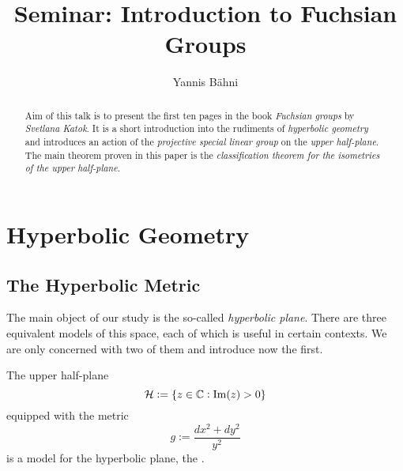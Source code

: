 

\title{Seminar: Introduction to Fuchsian Groups}
\author{Yannis B\"{a}hni}
\address[Yannis B\"{a}hni]{University of Zurich, R\"{a}mistrasse 71, 8006 Zurich}



\maketitle

\begin{abstract}
	Aim of this talk is to present the first ten pages in the book \emph{Fuchsian groups} by \emph{Svetlana Katok}. It is a short introduction into the rudiments of \emph{hyperbolic geometry} and introduces an action of the \emph{projective special linear group} on the \emph{upper half-plane}. The main theorem proven in this paper is the \emph{classification theorem for the isometries of the upper half-plane}.
\end{abstract}

\tableofcontents

\section{Hyperbolic Geometry}
\subsection{The Hyperbolic Metric}
The main object of our study is the so-called \emph{hyperbolic plane}. There are three equivalent models of this space, each of which is useful in certain contexts. We are only concerned with two of them and introduce now the first. 

\begin{definition}
	The upper half-plane
	\begin{equation}
		\Hcal := \cbr[0]{z \in \Cbb : \Im(z) > 0}
	\end{equation}
	\noindent equipped with the metric
	\begin{equation}
		g := \frac{dx^2 + dy^2}{y^2}
	\end{equation}
	\noindent is a model for the hyperbolic plane, the .
	\label{def:half_space_model}
\end{definition}

